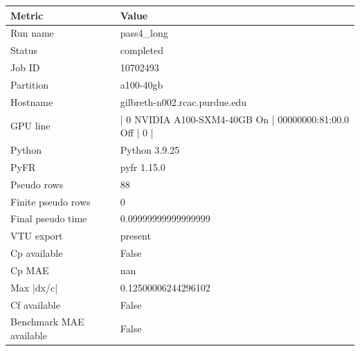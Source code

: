 \begin{tabular}{ll}
\toprule
Metric & Value\\
\midrule
Run name & pass4\_long\\
Status & completed\\
Job ID & 10702493\\
Partition & a100-40gb\\
Hostname & gilbreth-n002.rcac.purdue.edu\\
GPU line & |   0  NVIDIA A100-SXM4-40GB          On  |   00000000:81:00.0 Off |                    0 |\\
Python & Python 3.9.25\\
PyFR & pyfr 1.15.0\\
Pseudo rows & 88\\
Finite pseudo rows & 0\\
Final pseudo time & 0.09999999999999999\\
VTU export & present\\
Cp available & False\\
Cp MAE & nan\\
Max |dx/c| & 0.12500006244296102\\
Cf available & False\\
Benchmark MAE available & False\\
\bottomrule
\end{tabular}
